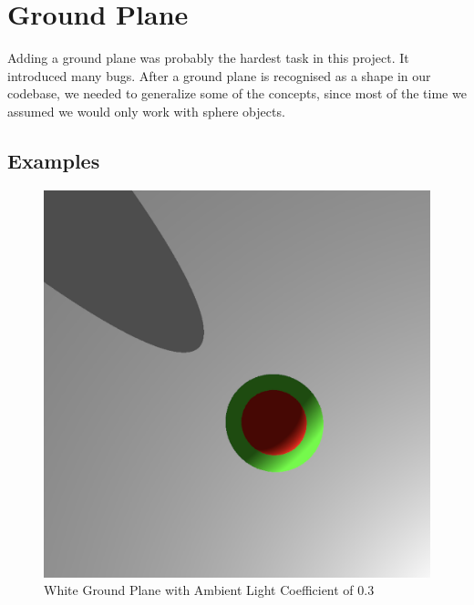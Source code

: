 \documentclass{article}
\begin{document}
\newpage

\section{Ground Plane}
\label{ground}

Adding a ground plane was probably the hardest task in this project. It introduced many bugs. After a ground plane is recognised as a shape in our codebase, we needed to generalize some of the concepts, since most of the time we assumed we would only work with sphere objects.

\subsection{Examples}
\label{examples}

\begin{centering}
\begin{figure}[H]
\includegraphics[width=1\textwidth]{./images/white-bg-ambient-03.png}
\caption{White Ground Plane with Ambient Light Coefficient of 0.3}
\label{fig:gp1}
\end{figure}
\begin{figure}[H]

\end{figure}
\end{centering}
\end{document}
